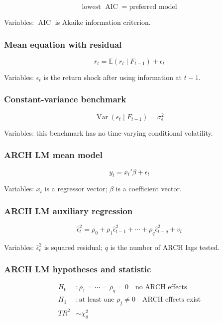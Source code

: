 \documentclass[
  8pt,
  twocolumn]{extarticle}
\begin{document}
\[
\text{lowest }\operatorname{AIC}=\text{preferred model}
\]

Variables: \(\operatorname{AIC}\) is Akaike information criterion.

\subsubsection{Mean equation with
residual}\label{mean-equation-with-residual}

\[
r_t=\mathbb E(r_t\mid F_{t-1})+\epsilon_t
\]

Variables: \(\epsilon_t\) is the return shock after using information at
\(t-1\).

\subsubsection{Constant-variance
benchmark}\label{constant-variance-benchmark}

\[
\operatorname{Var}(\epsilon_t\mid F_{t-1})=\sigma_\epsilon^2
\]

Variables: this benchmark has no time-varying conditional volatility.

\subsubsection{ARCH LM mean model}\label{arch-lm-mean-model}

\[
y_t=x_t'\beta+\epsilon_t
\]

Variables: \(x_t\) is a regressor vector; \(\beta\) is a coefficient
vector.

\subsubsection{ARCH LM auxiliary
regression}\label{arch-lm-auxiliary-regression}

\[
\hat\epsilon_t^2=\rho_0+\rho_1\hat\epsilon_{t-1}^2+\cdots+\rho_q\hat\epsilon_{t-q}^2+v_t
\]

Variables: \(\hat\epsilon_t^2\) is squared residual; \(q\) is the number
of ARCH lags tested.

\subsubsection{ARCH LM hypotheses and
statistic}\label{arch-lm-hypotheses-and-statistic}

\[
\begin{aligned}
H_0&:\rho_1=\cdots=\rho_q=0\quad \text{no ARCH effects}\\
H_1&:\text{at least one }\rho_j\ne0\quad \text{ARCH effects exist}\\
TR^2&\sim\chi_q^2
\end{aligned}
\]
\end{document}
